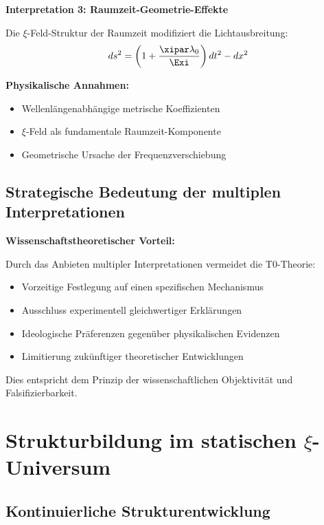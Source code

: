 	\begin{alternative}
		\textbf{Interpretation 3: Raumzeit-Geometrie-Effekte}
		
		Die $\xi$-Feld-Struktur der Raumzeit modifiziert die Lichtausbreitung:
		\begin{equation}
			ds^2 = \left(1 + \frac{\xipar \lambda_0}{\Exi}\right) dt^2 - dx^2
		\end{equation}
		
		\textbf{Physikalische Annahmen:}
		\begin{itemize}
			\item Wellenlängenabhängige metrische Koeffizienten
			\item $\xi$-Feld als fundamentale Raumzeit-Komponente
			\item Geometrische Ursache der Frequenzverschiebung
		\end{itemize}
	\end{alternative}

	\subsection{Strategische Bedeutung der multiplen Interpretationen}
	
	\begin{warning}
		\textbf{Wissenschaftstheoretischer Vorteil:}
		
		Durch das Anbieten multipler Interpretationen vermeidet die T0-Theorie:
		\begin{itemize}
			\item Vorzeitige Festlegung auf einen spezifischen Mechanismus
			\item Ausschluss experimentell gleichwertiger Erklärungen
			\item Ideologische Präferenzen gegenüber physikalischen Evidenzen
			\item Limitierung zukünftiger theoretischer Entwicklungen
		\end{itemize}
		
		Dies entspricht dem Prinzip der wissenschaftlichen Objektivität und Falsifizierbarkeit.
	\end{warning}	
	\section{Strukturbildung im statischen $\xi$-Universum}
	
	\subsection{Kontinuierliche Strukturentwicklung}
	

